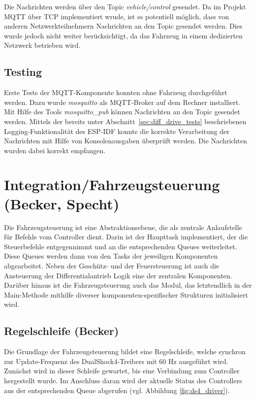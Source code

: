 Die Nachrichten werden über den Topic \textit{vehicle/control} gesendet. Da im Projekt MQTT über TCP implementiert wrude, ist es potentiell möglich, dass von anderen Netzwerkteilnehmern Nachrichten an den Topic gesendet werden. Dies wurde jedoch nicht weiter berücksichtigt, da das Fahrzeug in einem dedizierten Netzwerk betrieben wird. \newline

\subsection{Testing}

Erste Tests der MQTT-Komponente konnten ohne Fahrzeug durchgeführt werden. Dazu wurde \textit{mosquitto} als MQTT-Broker auf dem Rechner installiert. Mit Hilfe des Tools \textit{mosquitto\_pub} können Nachrichten an den Topic gesendet werden. Mittels der bereits unter Abschnitt~\ref{sec:diff_drive_tests} beschriebenen Logging-Funktionalität des ESP-IDF konnte die korrekte Verarbeitung der Nachrichten mit Hilfe von Konsolenausgaben überprüft werden. Die Nachrichten wurden dabei korrekt empfangen.

\section{Integration/Fahrzeugsteuerung (Becker, Specht) \label{sec:esp32_integration}}

Die Fahrzeugsteuerung ist eine Abstraktionsebene, die als zentrale Anlaufstelle für Befehle vom Controller dient. Darin ist der Haupttask implementiert, der die Steuerbefehle entgegennimmt und an die entsprechenden Queues weiterleitet. Diese Queues werden dann von den Tasks der jeweiligen Komponenten abgearbeitet. Neben der Geschütz- und der Feuersteuerung ist auch die Ansteuerung der Differentialantrieb Logik eine der zentralen Komponenten. Darüber hinaus ist die Fahrzeugsteuerung auch das Modul, das letztendlich in der Main-Methode mithilfe diverser komponenten-spezifischer Strukturen initialisiert wird. \newline

\subsection{Regelschleife (Becker)}

Die Grundlage der Fahrzeugsteuerung bildet eine Regelschleife, welche synchron zur Update-Frequenz des DualShock4-Treibers mit 60 Hz ausgeführt wird. 
Zunächst wird in dieser Schleife gewartet, bis eine Verbindung zum Controller hergestellt wurde.
Im Anschluss daran wird der aktuelle Status des Controllers aus der entsprechenden Queue abgerufen (vgl. Abbildung \ref{fig:ds4_driver}).

